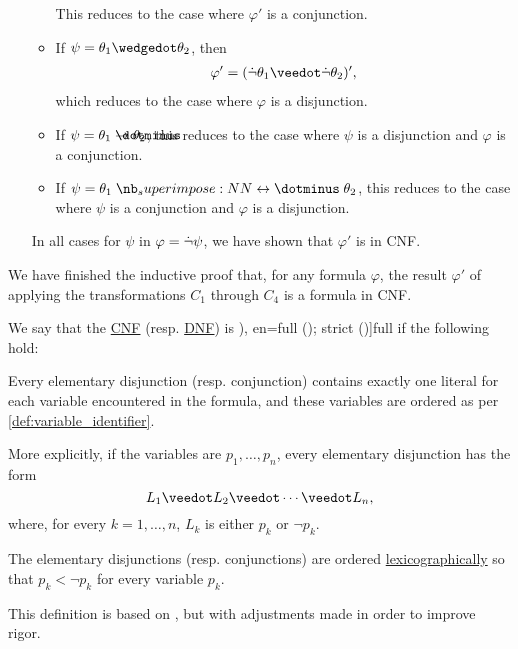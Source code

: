 \begin{defproof}
\begin{itemize}
\begin{itemize}
      This reduces to the case where \( \varphi' \) is a conjunction.

      \item If \( \psi = \theta_1 \synwedge \theta_2 \), then
      \begin{align*}
        \varphi'
        =
        (\synneg \theta_1 \synvee \synneg \theta_2)',
      \end{align*}
      which reduces to the case where \( \varphi \) is a disjunction.

      \item If \( \psi = \theta_1 \synimplies \theta_2 \), this reduces to the case where \( \psi \) is a disjunction and \( \varphi \) is a conjunction.
      \item If \( \psi = \theta_1 \syniff \theta_2 \), this reduces to the case where \( \psi \) is a conjunction and \( \varphi \) is a disjunction.
    \end{itemize}

    In all cases for \( \psi \) in \( \varphi = \dot{\neg} \psi \), we have shown that \( \varphi' \) is in CNF.
  \end{itemize}

  We have finished the inductive proof that, for any formula \( \varphi \), the result \( \varphi' \) of applying the transformations \( C_1 \) through \( C_4 \) is a formula in CNF.
\end{defproof}

\begin{definition}\label{def:full_cnf_and_dnf}\mimprovised
  We say that the \hyperref[def:cnf_and_dnf]{CNF} (resp. \hyperref[def:cnf_and_dnf]{DNF}) is \term[ru=совершенная (\cite[def. 6.3; def. 6.4]{Эдельман1975Логика}), en=full (); strict (\cite[def. 1.3.10]{Hinman2005Logic})]{full} if the following hold:
  \begin{thmenum}
     Every elementary disjunction (resp. conjunction) contains exactly one literal for each variable encountered in the formula, and these variables are ordered as per \cref{def:variable_identifier}.

    More explicitly, if the variables are \( p_1, \ldots, p_n \), every elementary disjunction has the form
    \begin{equation*}
      L_1 \synvee L_2 \synvee \cdots \synvee L_n,
    \end{equation*}
    where, for every \( k = 1, \ldots, n \), \( L_k \) is either \( p_k \) or \( \neg p_k \).

     The elementary disjunctions (resp. conjunctions) are ordered \hyperref[def:lexicographic_order]{lexicographically} so that \( p_k < \neg p_k \) for every variable \( p_k \).
  \end{thmenum}
\end{definition}
\begin{comments}
  \item This definition is based on \cite[def. 6.3; def. 6.4]{Эдельман1975Логика}, but with adjustments made in order to improve rigor.
\end{comments}

